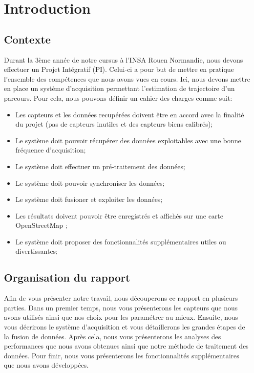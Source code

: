 \chapter{Introduction}

\section{Contexte}
Durant la 3ème année de notre cursus à l'INSA Rouen Normandie, nous devons effectuer un Projet Intégratif (PI). Celui-ci a pour but de mettre en pratique l'ensemble des compétences que nous avons vues en cours. Ici, nous devons mettre en place un système d'acquisition permettant l'estimation de trajectoire d'un parcours. Pour cela, nous pouvons définir un cahier des charges comme suit:
\begin{itemize}
  \item Les capteurs et les données recupérées doivent être en accord avec la finalité du projet (pas de capteurs inutiles et des capteurs biens calibrés);
  \item Le système doit pouvoir récupérer des données exploitables avec une bonne fréquence d'acquisition;
  \item Le système doit effectuer un pré-traitement des données;
  \item Le système doit pouvoir synchroniser les données;
  \item Le système doit fusioner et exploiter les données;
  \item Les résultats doivent pouvoir être enregistrés et affichés sur une carte OpenStreetMap ;
  \item Le système doit proposer des fonctionnalités supplémentaires utiles ou divertissantes;
\end{itemize}

\section{Organisation du rapport}
Afin de vous présenter notre travail, nous découperons ce rapport en plusieurs parties. Dans un premier temps, nous vous présenterons les capteurs que nous avons utilisés ainsi que nos choix pour les paramétrer au mieux. Ensuite, nous vous décrirons le système d’acquisition et vous détaillerons les grandes étapes de la fusion de données. Après cela, nous vous présenterons les analyses des performances que nous avons obtenues ainsi que notre méthode de traitement des données. Pour finir, nous vous présenterons les fonctionnalités supplémentaires que nous avons développées.
